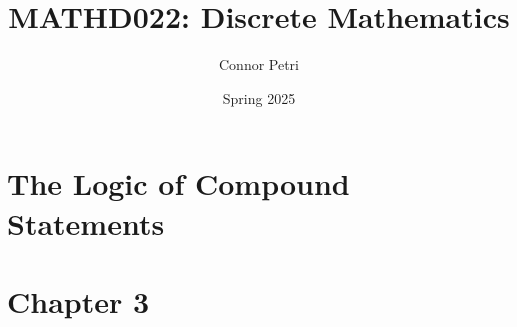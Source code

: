 \documentclass[12pt, letterpaper]{article}
\title{MATHD022: Discrete Mathematics}
\author{Connor Petri}
\date{Spring 2025}
\begin{document}
\maketitle
\pagebreak
\tableofcontents
\pagebreak





\section{The Logic of Compound Statements}




\section{Chapter 3}



\end{document}
